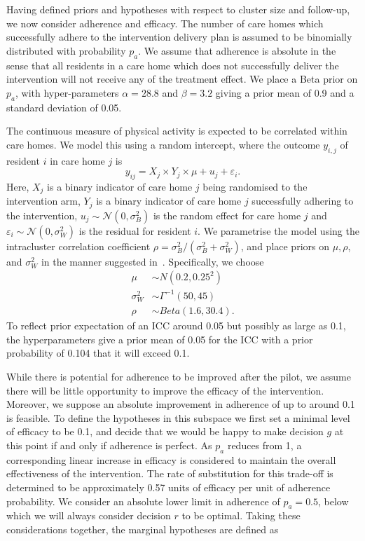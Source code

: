 \documentclass[AMA,STIX1COL]{WileyNJD-v2}
\begin{document}
Having defined priors and hypotheses with respect to cluster size and follow-up, we now consider adherence and efficacy. The number of care homes which successfully adhere to the intervention delivery plan is assumed to be binomially distributed with probability $p_{a}$. We assume that adherence is absolute in the sense that all residents in a care home which does not successfully deliver the intervention will not receive any of the treatment effect. We place a Beta prior on $p_{a}$, with hyper-parameters $\alpha = 28.8$ and $\beta = 3.2$ giving a prior mean of 0.9 and a standard deviation of 0.05.

The continuous measure of physical activity is expected to be correlated within care homes. We model this using a random intercept, where the outcome $y_{i,j}$ of resident $i$ in care home $j$ is
\begin{equation}
y_{ij} = X_{j} \times Y_{j} \times \mu + u_{j} + \varepsilon_{i}.
\end{equation}
Here, $X_{j}$ is a binary indicator of care home $j$ being randomised to the intervention arm, $Y_{j}$ is a binary indicator of care home $j$ successfully adhering to the intervention, $u_{j} \sim \mathcal{N}(0, \sigma_{B}^{2})$ is the random effect for care home $j$ and $\varepsilon_{i} \sim \mathcal{N}(0, \sigma_{W}^{2})$ is the residual for resident $i$. We parametrise the model using the intracluster correlation coefficient $\rho = \sigma_{B}^{2} / (\sigma_{B}^{2} + \sigma_{W}^{2})$, and place priors on $\mu, \rho$, and $\sigma_{W}^{2}$ in the manner suggested in~\cite{Spiegelhalter2001}. Specifically, we choose
\begin{align}
\mu & \sim N(0.2, 0.25^{2}) \\
\sigma_{W}^{2} & \sim \Gamma^{-1}(50, 45) \\
\rho & \sim Beta(1.6, 30.4).
\end{align}
To reflect prior expectation of an ICC around 0.05 but possibly as large as 0.1, the hyperparameters give a prior mean of 0.05 for the ICC with a prior probability of 0.104 that it will exceed 0.1. 

While there is potential for adherence to be improved after the pilot, we assume there will be little opportunity to improve the efficacy of the intervention. Moreover, we suppose an absolute improvement in adherence of up to around 0.1 is feasible. To define the hypotheses in this subspace we first set a minimal level of efficacy to be 0.1, and decide that we would be happy to make decision $g$ at this point if and only if adherence is perfect. As $p_{a}$ reduces from 1, a corresponding linear increase in efficacy is considered to maintain the overall effectiveness of the intervention. The rate of substitution for this trade-off is determined to be approximately 0.57 units of efficacy per unit of adherence probability. We consider an absolute lower limit in adherence of $p_{a} = 0.5$, below which we will always consider decision $r$ to be optimal. Taking these considerations together, the marginal hypotheses are defined as
\end{document}
